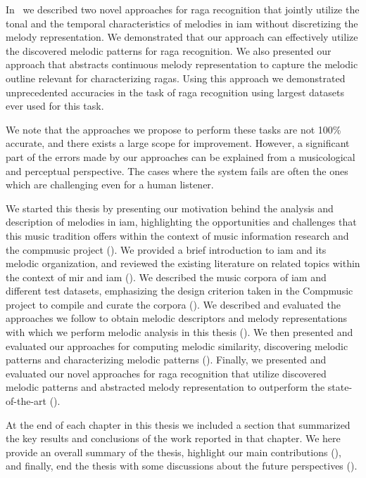  In~ we described two novel approaches for \gls{raga} recognition that jointly utilize the tonal and the temporal characteristics of melodies in \gls{iam} without discretizing the melody representation. We demonstrated that our approach can effectively utilize the discovered melodic patterns for \gls{raga} recognition. We also presented our approach that abstracts continuous melody representation to capture the melodic outline relevant for characterizing \glspl{raga}. Using this approach we demonstrated unprecedented accuracies in the task of \gls{raga} recognition using largest datasets ever used for this task. 
 
 We note that the approaches we propose to perform these tasks are not 100\% accurate, and there exists a large scope for improvement. However, a significant part of the errors made by our approaches can be explained from a musicological and perceptual perspective. The cases where the system fails are often the ones which are challenging even for a human listener. 
 
 We started this thesis by presenting our motivation behind the analysis and description of melodies in \gls{iam}, highlighting the opportunities and challenges that this music tradition offers within the context of music information research and the compmusic project (). We provided a brief introduction to \gls{iam} and its melodic organization,  and reviewed the existing literature on related topics within the context of \gls{mir} and \gls{iam} (). We described the music corpora of \gls{iam} and different test datasets, emphasizing the design criterion taken in the Compmusic project to compile and curate the corpora ().  We described and evaluated the approaches we follow to obtain melodic descriptors and melody representations with which we perform melodic analysis in this thesis (). We then presented and evaluated our approaches for computing melodic similarity, discovering melodic patterns and characterizing melodic patterns (). Finally, we presented and evaluated our novel approaches for \gls{raga} recognition that utilize discovered melodic patterns and abstracted melody representation to outperform the state-of-the-art ().
 
 At the end of each chapter in this thesis we included a section that summarized the key results and conclusions of the work reported in that chapter. We here provide an overall summary of the thesis, highlight our main contributions (), and finally, end the thesis with some discussions about the future perspectives (). 
 
